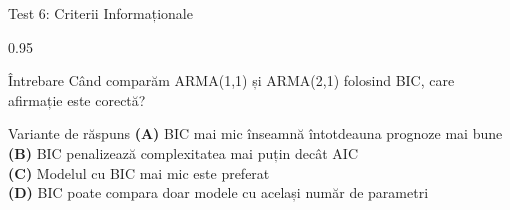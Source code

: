 \documentclass[9pt, aspectratio=169, t]{beamer}
\begin{document}
\begin{frame}{Test 6: Criterii Informaționale}
    \begin{cminipage}{0.95\textwidth}
    \begin{alertblock}{Întrebare}
        Când comparăm ARMA(1,1) și ARMA(2,1) folosind BIC, care afirmație este corectă?
    \end{alertblock}

    \vspace{0.5cm}
    \begin{block}{Variante de răspuns}
    \textcolor{MainBlue}{\textbf{(A)}} BIC mai mic înseamnă întotdeauna prognoze mai bune\\[3pt]
    \textcolor{MainBlue}{\textbf{(B)}} BIC penalizează complexitatea mai puțin decât AIC\\[3pt]
    \textcolor{MainBlue}{\textbf{(C)}} Modelul cu BIC mai mic este preferat\\[3pt]
    \textcolor{MainBlue}{\textbf{(D)}} BIC poate compara doar modele cu același număr de parametri
    \end{block}
    \end{cminipage}
\end{frame}
\end{document}
